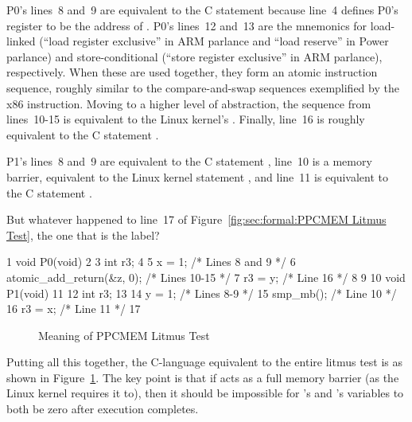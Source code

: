 P0's lines~8 and~9 are equivalent to the C statement  because
line~4 defines P0's register  to be the address of . P0's
lines~12 and~13 are the mnemonics for load-linked (``load register
exclusive'' in ARM parlance and ``load reserve'' in Power parlance)
and store-conditional (``store register exclusive'' in ARM parlance),
respectively. When these are used together, they form an atomic
instruction sequence, roughly similar to the compare-and-swap sequences
exemplified by the x86  instruction. Moving to a higher
level of abstraction, the sequence from lines~10-15 is equivalent to
the Linux kernel's . Finally, line~16 is
roughly equivalent to the C statement .

P1's lines~8 and~9 are equivalent to the C statement , line~10
is a memory barrier, equivalent to the Linux kernel statement ,
and line~11 is equivalent to the C statement .

\QuickQuiz{}
	But whatever happened to line~17 of
	Figure~\ref{fig:sec:formal:PPCMEM Litmus Test},
	the one that is the  label?
 \QuickQuizEnd

{ \scriptsize
\begin{verbbox}
 1 void P0(void)
 2 {
 3   int r3;
 4 
 5   x = 1; /* Lines 8 and 9 */
 6   atomic_add_return(&z, 0); /* Lines 10-15 */
 7   r3 = y; /* Line 16 */
 8 }
 9 
10 void P1(void)
11 {
12   int r3;
13 
14   y = 1; /* Lines 8-9 */
15   smp_mb(); /* Line 10 */
16   r3 = x; /* Line 11 */
17 }
\end{verbbox}
}
\begin{figure}[tbp]
\centering
\theverbbox
\caption{Meaning of PPCMEM Litmus Test}
\label{fig:sec:formal:Meaning of PPCMEM Litmus Test}
\end{figure}

Putting all this together, the C-language equivalent to the entire litmus
test is as shown in
Figure~\ref{fig:sec:formal:Meaning of PPCMEM Litmus Test}.
The key point is that if  acts as a full
memory barrier (as the Linux kernel requires it to), 
then it should be impossible for 's and 's 
variables to both be zero after execution completes.

